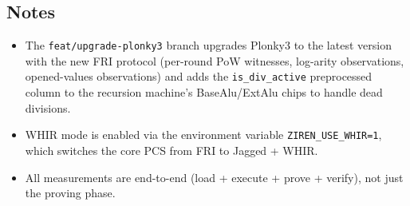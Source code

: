 \subsection{Notes}
\begin{itemize}
  \item The \texttt{feat/upgrade-plonky3} branch upgrades Plonky3 to the latest
        version with the new FRI protocol (per-round PoW witnesses, log-arity
        observations, opened-values observations) and adds the
        \texttt{is\_div\_active} preprocessed column to the recursion
        machine's BaseAlu/ExtAlu chips to handle dead divisions.
  \item WHIR mode is enabled via the environment variable
        \texttt{ZIREN\_USE\_WHIR=1}, which switches the core PCS from FRI to
        Jagged + WHIR.
  \item All measurements are end-to-end (load + execute + prove + verify),
        not just the proving phase.
\end{itemize}
